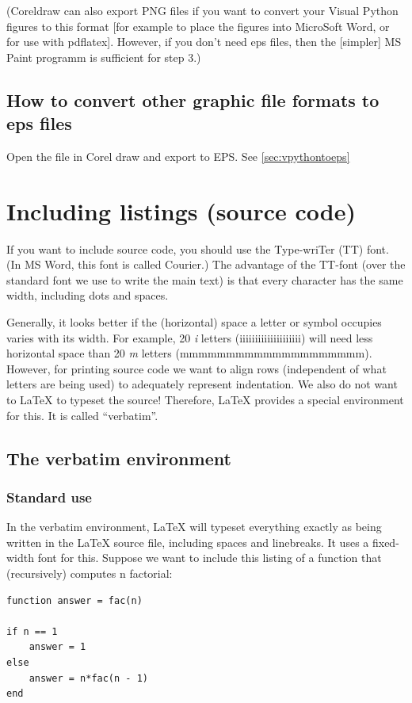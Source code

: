 \documentclass[12pt,a4paper]{article}
\begin{document}
(Coreldraw can also export PNG files if you want to convert your
Visual Python figures to this format [for example to place the figures
into MicroSoft Word, or for use with pdflatex]. However, if you don't
need eps files, then the [simpler] MS Paint programm is sufficient for
step 3.)


\subsection{How to convert other graphic file formats to eps files}
\label{sec:conversiontoeps}

Open the file in Corel draw and export to EPS. See \ref{sec:vpythontoeps}


\section{Including listings (source code)}

If you want to include source code, you should use the Type-wriTer
(TT) font. (In MS Word, this font is called Courier.) The advantage of
the TT-font (over the standard font we use to write the main text) is
that every character has the same width, including dots and spaces.

Generally, it looks better if the (horizontal) space a letter or
symbol occupies varies with its width. For example, 20 \emph{i}
letters (iiiiiiiiiiiiiiiiiiii) will need less horizontal space than 20
\emph{m} letters (mmmmmmmmmmmmmmmmmmmm). However, for printing source
code we want to align rows (independent of what letters are being
used) to adequately represent indentation. We also do not want to
\LaTeX{} to typeset the source! Therefore, \LaTeX{} provides a special
environment for this. It is called ``verbatim''.


\subsection{The verbatim environment}

\subsubsection{Standard use}

In the verbatim environment, \LaTeX{} will typeset everything exactly
as being written in the \LaTeX{} source file, including spaces and
linebreaks. It uses a fixed-width font for this. Suppose we want to 
include this listing of a function that (recursively) computes n
factorial:
\begin{verbatim}
function answer = fac(n)

if n == 1
    answer = 1
else
    answer = n*fac(n - 1)
end
\end{verbatim}
\end{document}
